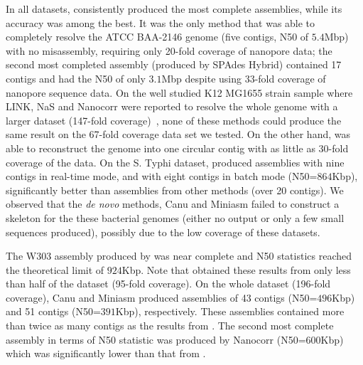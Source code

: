 In all datasets, \npscarf{} consistently
produced the most complete assemblies, while its accuracy was among the best.
It was the only method that was able to completely resolve the \kp{} ATCC BAA-2146
genome (five contigs, N50 of $5.4$Mbp) with no misassembly, requiring only
20-fold coverage of nanopore data; the second most completed assembly 
(produced by SPAdes Hybrid) contained 17 contigs and had the N50 of 
only $3.1$Mbp despite using 33-fold coverage of nanopore sequence data.
On the well studied \ec{} K12 MG1655 strain
sample where LINK, NaS and Nanocorr were reported to resolve the whole genome
with a larger dataset (147-fold coverage)~\cite{WarrenYV2015}, 
none of these methods could produce the same result on the 67-fold coverage data
set we tested. On the other hand, \npscarf{} was able to reconstruct the genome
into one circular contig with as little as 30-fold coverage of the 
data. On the S. Typhi dataset, \npscarf{} produced assemblies with nine contigs
in real-time mode, and with eight contigs in batch mode (N50=$864$Kbp),
significantly better than assemblies from other methods (over 20 contigs).
We observed that the \emph{de novo} methods, Canu and Miniasm failed to
construct a skeleton for the these bacterial genomes (either no output or only 
a few small sequences produced), possibly due to the low coverage of these
datasets.


The \sce{} W303 assembly produced by \npscarf{} was near complete and N50
statistics reached the theoretical limit of $924$Kbp. Note that \npscarf{} obtained
these results from only less than half of the dataset (95-fold coverage). On
the whole dataset (196-fold coverage), Canu and Miniasm produced assemblies of
43 contigs (N50=$496$Kbp) and 51 contigs (N50=$391$Kbp), respectively. These
assemblies contained more than twice as many contigs as the results from
\npscarf{}. The second most complete assembly in terms of N50 statistic was
produced by Nanocorr (N50=$600$Kbp) which was significantly lower than that from
\npscarf{}.


